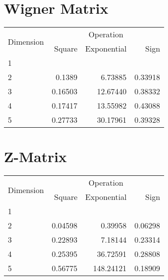 \documentclass{article}
\begin{document}
\section{Wigner Matrix}
\begin{tabular}{@{}lrrr@{}}
\toprule
\multirow{2}{*}{Dimension} & \multicolumn{3}{c}{Operation} \\
\cmidrule(l){2-4}
& Square & Exponential & Sign \\
\midrule
1 & & & \\
2 & 0.1389 & 6.73885 & 0.33918 \\
3 & 0.16503 & 12.67440 & 0.38332 \\
4 & 0.17417 & 13.55982 & 0.43088 \\
5 & 0.27733 & 30.17961 & 0.39328 \\
\bottomrule
\end{tabular}

\section{Z-Matrix}
\begin{tabular}{@{}lrrr@{}}
\toprule
\multirow{2}{*}{Dimension} & \multicolumn{3}{c}{Operation} \\
\cmidrule(l){2-4}
& Square & Exponential & Sign \\
\midrule
1 & & & \\
2 & 0.04598 & 0.39958 & 0.06298 \\
3 & 0.22893 & 7.18144 & 0.23314 \\
4 & 0.25395 & 36.72591 & 0.28808 \\
5 & 0.56775 & 148.24121 & 0.18909 \\
\bottomrule
\end{tabular}
\end{document}
